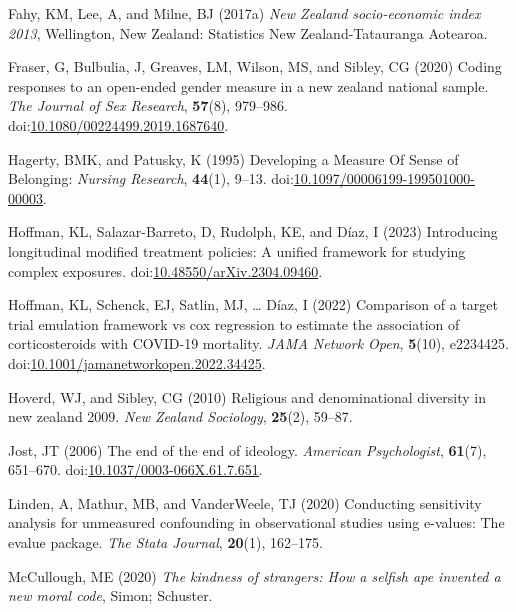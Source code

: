 \documentclass[
  singlecolumn]{article}
\newlength{\cslhangindent}
\newenvironment{CSLReferences}[2] %
 {\begin{list}{}{%
  \setlength{\itemindent}{0pt}
  \setlength{\leftmargin}{0pt}
  \setlength{\parsep}{0pt}
  \ifodd #1
   \setlength{\leftmargin}{\cslhangindent}
   \setlength{\itemindent}{-1\cslhangindent}
  \fi
  \setlength{\itemsep}{#2\baselineskip}}}
 {\end{list}}
\begin{document}
\begin{CSLReferences}{1}{0}
Fahy, KM, Lee, A, and Milne, BJ (2017a) \emph{New Zealand socio-economic
index 2013}, Wellington, New Zealand: Statistics New Zealand-Tatauranga
Aotearoa.

Fraser, G, Bulbulia, J, Greaves, LM, Wilson, MS, and Sibley, CG (2020)
Coding responses to an open-ended gender measure in a new zealand
national sample. \emph{The Journal of Sex Research}, \textbf{57}(8),
979--986.
doi:\href{https://doi.org/10.1080/00224499.2019.1687640}{10.1080/00224499.2019.1687640}.

Hagerty, BMK, and Patusky, K (1995) Developing a Measure Of Sense of
Belonging: \emph{Nursing Research}, \textbf{44}(1), 9--13.
doi:\href{https://doi.org/10.1097/00006199-199501000-00003}{10.1097/00006199-199501000-00003}.

Hoffman, KL, Salazar-Barreto, D, Rudolph, KE, and Díaz, I (2023)
Introducing longitudinal modified treatment policies: A unified
framework for studying complex exposures.
doi:\href{https://doi.org/10.48550/arXiv.2304.09460}{10.48550/arXiv.2304.09460}.

Hoffman, KL, Schenck, EJ, Satlin, MJ, \ldots{} Díaz, I (2022) Comparison
of a target trial emulation framework vs cox regression to estimate the
association of corticosteroids with COVID-19 mortality. \emph{JAMA
Network Open}, \textbf{5}(10), e2234425.
doi:\href{https://doi.org/10.1001/jamanetworkopen.2022.34425}{10.1001/jamanetworkopen.2022.34425}.

Hoverd, WJ, and Sibley, CG (2010) Religious and denominational diversity
in new zealand 2009. \emph{New Zealand Sociology}, \textbf{25}(2),
59--87.

Jost, JT (2006) The end of the end of ideology. \emph{American
Psychologist}, \textbf{61}(7), 651--670.
doi:\href{https://doi.org/10.1037/0003-066X.61.7.651}{10.1037/0003-066X.61.7.651}.

Linden, A, Mathur, MB, and VanderWeele, TJ (2020) Conducting sensitivity
analysis for unmeasured confounding in observational studies using
e-values: The evalue package. \emph{The Stata Journal}, \textbf{20}(1),
162--175.

McCullough, ME (2020) \emph{The kindness of strangers: How a selfish ape
invented a new moral code}, Simon; Schuster.


\end{CSLReferences}
\end{document}
